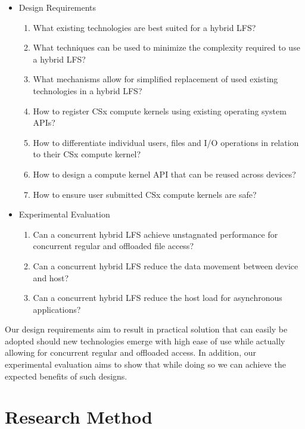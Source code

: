 \begin{itemize}
    \item Design Requirements
    \begin{enumerate}
        \item What existing technologies are best suited for a hybrid LFS?
        \item What techniques can be used to minimize the complexity required to
              use a hybrid LFS?
        \item What mechanisms allow for simplified replacement of used existing
              technologies in a hybrid LFS?
        \item How to register CSx compute kernels using existing operating 
              system APIs?
        \item How to differentiate individual users, files and I/O operations in
              relation to their CSx compute kernel?
        \item How to design a compute kernel API that can be reused across
              devices?
        \item How to ensure user submitted CSx compute kernels are safe?
    \end{enumerate}
    \item Experimental Evaluation
    \begin{enumerate}
        \item Can a concurrent hybrid LFS achieve unstagnated performance
              for concurrent regular and offloaded file access?
        \item Can a concurrent hybrid LFS reduce the data movement
              between device and host?
        \item Can a concurrent hybrid LFS reduce the host load for
              asynchronous applications?
    \end{enumerate}
\end{itemize}

Our design requirements aim to result in practical solution that can easily be
adopted should new technologies emerge with high ease of use while actually
allowing for concurrent regular and offloaded access. In addition, our
experimental evaluation aims to show that while doing so we can achieve the
expected benefits of such designs.

\section{Research Method}


